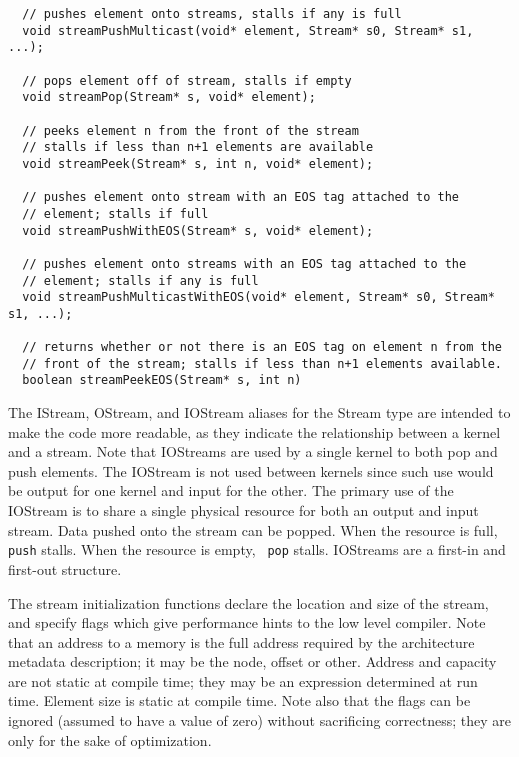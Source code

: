 {\begin{verbatim}
  // pushes element onto streams, stalls if any is full
  void streamPushMulticast(void* element, Stream* s0, Stream* s1, ...);
  
  // pops element off of stream, stalls if empty
  void streamPop(Stream* s, void* element);
  
  // peeks element n from the front of the stream
  // stalls if less than n+1 elements are available
  void streamPeek(Stream* s, int n, void* element);

  // pushes element onto stream with an EOS tag attached to the
  // element; stalls if full
  void streamPushWithEOS(Stream* s, void* element);

  // pushes element onto streams with an EOS tag attached to the
  // element; stalls if any is full
  void streamPushMulticastWithEOS(void* element, Stream* s0, Stream* s1, ...);

  // returns whether or not there is an EOS tag on element n from the
  // front of the stream; stalls if less than n+1 elements available.
  boolean streamPeekEOS(Stream* s, int n)

\end{verbatim}}

 The IStream, OStream, and IOStream aliases for the
Stream type are intended to make the code more readable, as they
indicate the relationship between a kernel and a stream.  Note that
IOStreams are used by a single kernel to both pop and push elements.
The IOStream is not used between kernels since such use would be
output for one kernel and input for the other. The primary use of the
IOStream is to share a single physical resource for both an output and
input stream.  Data pushed onto the stream can be popped.  When the
resource is full, {\tt push} stalls.  When the resource is empty, {\tt
pop} stalls.  IOStreams are a first-in and first-out structure.

 The stream initialization functions
declare the location and size of the stream, and specify flags which
give performance hints to the low level compiler.  Note that an
address to a memory is the full address required by the architecture
metadata description; it may be the node, offset or other.  Address
and capacity are not static at compile time; they may be an expression
determined at run time.  Element size is static at compile time.  Note
also that the flags can be ignored (assumed to have a value of zero)
without sacrificing correctness; they are only for the sake of
optimization.

